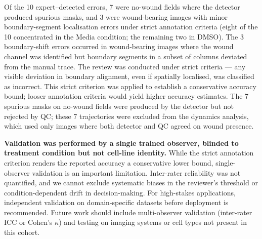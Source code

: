 Of the 10 expert--detected errors, 7 were no-wound fields where the detector produced spurious masks, and 3 were wound-bearing images with minor boundary-segment localisation errors under strict annotation criteria (eight of the 10 concentrated in the Media condition; the remaining two in DMSO). The 3 boundary-shift errors occurred in wound-bearing images where the wound channel was identified but boundary segments in a subset of columns deviated from the manual trace. The review was conducted under strict criteria --- any visible deviation in boundary alignment, even if spatially localised, was classified as incorrect. This strict criterion was applied to establish a conservative accuracy bound; looser annotation criteria would yield higher accuracy estimates. The 7 spurious masks on no-wound fields were produced by the detector but not rejected by QC; these 7 trajectories were excluded from the dynamics analysis, which used only images where both detector and QC agreed on wound presence.

\textbf{Validation was performed by a single trained observer, blinded to treatment condition but not cell-line identity.} While the strict annotation criterion renders the reported accuracy a conservative lower bound, single-observer validation is an important limitation. Inter-rater reliability was not quantified, and we cannot exclude systematic biases in the reviewer's threshold or condition-dependent drift in decision-making. For high-stakes applications, independent validation on domain-specific datasets before deployment is recommended. Future work should include multi-observer validation (inter-rater ICC or Cohen's $\kappa$) and testing on imaging systems or cell types not present in this cohort.


